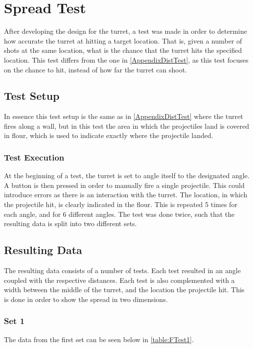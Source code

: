 \chapter{Spread Test}\label{AppendixAccTest}
After developing the design for the turret, a test was made in order to
determine how accurate the turret at hitting a target location. That is,
given a number of shots at the same location, what is the chance that the turret
hits the specified location. This test differs from the one in
\autoref{AppendixDistTest}, as this test focuses on the chance to hit, instead
of how far the turret can shoot.

\section{Test Setup}
In essence this test setup is the same as in \autoref{AppendixDistTest} where
the turret fires along a wall, but in this test the area in which the
projectiles land is covered in flour, which is used to indicate exactly
where the projectile landed.

\subsection{Test Execution}
At the beginning of a test, the turret is set to angle itself to the designated
angle. A button is then pressed in order to manually fire a single projectile.
This could introduce errors as there is an interaction with the turret. The
location, in which the projectile hit, is clearly indicated in the flour. This
is repeated 5 times for each angle, and for 6 different angles. The test
was done twice, such that the resulting data is split into two different sets.

\section{Resulting Data}
The resulting data consists of a number of tests. Each test resulted in an
angle coupled with the respective distances. Each test is also complemented
with a width between the middle of the turret, and the location the projectile
hit.
This is done in order to show the spread in two dimensions.

\subsection{Set 1}
The data from the first set can be seen below in \autoref{table:FTest1}. 

